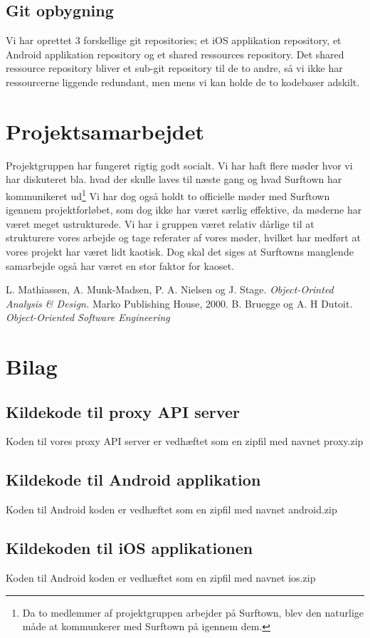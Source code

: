 \documentclass[12pt]{article}
\begin{document}
\subsection{Git opbygning}
Vi har oprettet 3 forskellige git repositories; et iOS applikation repository, et Android applikation repository og et shared ressources repository. Det shared ressource repository bliver et sub-git repository til de to andre, så vi ikke har ressourcerne liggende redundant, men mens vi kan holde de to kodebaser adskilt.
\section{Projektsamarbejdet}
Projektgruppen har fungeret rigtig godt socialt. Vi har haft flere møder hvor vi har diskuteret bla. hvad der skulle laves til næste gang og hvad Surftown har kommunikeret ud\footnote{Da to medlemmer af projektgruppen arbejder på Surftown, blev den naturlige måde at kommunkerer med Surftown på igennem dem.}
Vi har dog også holdt to officielle møder med Surftown igennem projektforløbet, som dog ikke har været særlig effektive, da møderne har været meget ustrukturede.
Vi har i gruppen været relativ dårlige til at strukturere vores arbejde og tage referater af vores møder, hvilket har medført at vores projekt har været lidt kaotisk. Dog skal det siges at Surftowns manglende samarbejde også har været en stor faktor for kaoset.

\begin{thebibliography}{99}
 L. Mathiassen, A. Munk-Madsen, P. A. Nielsen og J. Stage.
\emph{Object-Orinted Analysis \& Design.} Marko Publishing House, 2000.
 B. Bruegge og A. H Dutoit.
\emph{Object-Oriented Software Engineering}
\end{thebibliography}
\section{Bilag}
\subsection{Kildekode til proxy API server}
Koden til vores proxy API server er vedhæftet som en zipfil med navnet proxy.zip
\subsection{Kildekode til Android applikation}
Koden til Android koden er vedhæftet som en zipfil med navnet android.zip
\subsection{Kildekoden til iOS applikationen}
Koden til Android koden er vedhæftet som en zipfil med navnet ios.zip
\newpage
\end{document}
